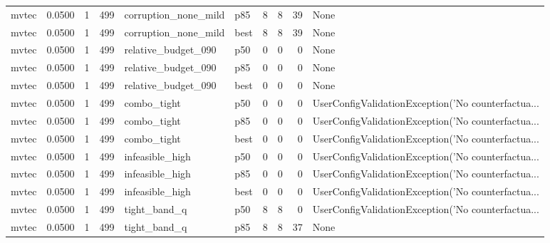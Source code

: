 \begin{tabular}{lrrrllrrrl}
   mvtec &    0.0500 &    1 &    499 & corruption\_none\_mild &    p85 &               8 &          8 &      39 &                                               None \\
   mvtec &    0.0500 &    1 &    499 & corruption\_none\_mild &   best &               8 &          8 &      39 &                                               None \\
   mvtec &    0.0500 &    1 &    499 &  relative\_budget\_090 &    p50 &               0 &          0 &       0 &                                               None \\
   mvtec &    0.0500 &    1 &    499 &  relative\_budget\_090 &    p85 &               0 &          0 &       0 &                                               None \\
   mvtec &    0.0500 &    1 &    499 &  relative\_budget\_090 &   best &               0 &          0 &       0 &                                               None \\
   mvtec &    0.0500 &    1 &    499 &          combo\_tight &    p50 &               0 &          0 &       0 & UserConfigValidationException('No counterfactua... \\
   mvtec &    0.0500 &    1 &    499 &          combo\_tight &    p85 &               0 &          0 &       0 & UserConfigValidationException('No counterfactua... \\
   mvtec &    0.0500 &    1 &    499 &          combo\_tight &   best &               0 &          0 &       0 & UserConfigValidationException('No counterfactua... \\
   mvtec &    0.0500 &    1 &    499 &      infeasible\_high &    p50 &               0 &          0 &       0 & UserConfigValidationException('No counterfactua... \\
   mvtec &    0.0500 &    1 &    499 &      infeasible\_high &    p85 &               0 &          0 &       0 & UserConfigValidationException('No counterfactua... \\
   mvtec &    0.0500 &    1 &    499 &      infeasible\_high &   best &               0 &          0 &       0 & UserConfigValidationException('No counterfactua... \\
   mvtec &    0.0500 &    1 &    499 &         tight\_band\_q &    p50 &               8 &          8 &       0 & UserConfigValidationException('No counterfactua... \\
   mvtec &    0.0500 &    1 &    499 &         tight\_band\_q &    p85 &               8 &          8 &      37 &                                               None \\

\end{tabular}
